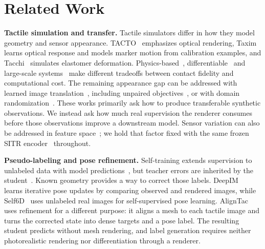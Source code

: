 \section{Related Work}

\noindent\textbf{Tactile simulation and transfer.}
Tactile simulators differ in how they model geometry and sensor appearance. TACTO~\cite{wang2022tacto} emphasizes optical rendering, Taxim~\cite{si2022taxim} learns optical response and models marker motion from calibration examples, and Tacchi~\cite{chen2023tacchi} simulates elastomer deformation. Physics-based~\cite{agarwal2021simulation}, differentiable~\cite{xu2022efficient} and large-scale systems~\cite{akinola2025tacsl} make different tradeoffs between contact fidelity and computational cost. The remaining appearance gap can be addressed with learned image translation~\cite{church2022tactile,chen2022cyclegan,zhong2025tactgen}, including unpaired objectives~\cite{shrivastava2017simgan,zhu2017cyclegan,park2020cut}, or with domain randomization~\cite{tobin2017domain}. These works primarily ask how to produce transferable synthetic observations. We instead ask how much real supervision the renderer consumes before those observations improve a downstream model. Sensor variation can also be addressed in feature space~\cite{gupta2025sitr,zhao2024transferable,higuera2024sparsh}; we hold that factor fixed with the same frozen SITR encoder~\cite{gupta2025sitr} throughout.

\noindent\textbf{Pseudo-labeling and pose refinement.}
Self-training extends supervision to unlabeled data with model predictions~\cite{lee2013pseudo,xie2020noisy}, but teacher errors are inherited by the student~\cite{arazo2020pseudo}. Known geometry provides a way to correct those labels. DeepIM~\cite{li2018deepim} learns iterative pose updates by comparing observed and rendered images, while Self6D~\cite{wang2020self6d} uses unlabeled real images for self-supervised pose learning. AlignTac uses refinement for a different purpose: it aligns a mesh to each tactile image and turns the corrected state into dense targets and a pose label. The resulting student predicts without mesh rendering, and label generation requires neither photorealistic rendering nor differentiation through a renderer.
